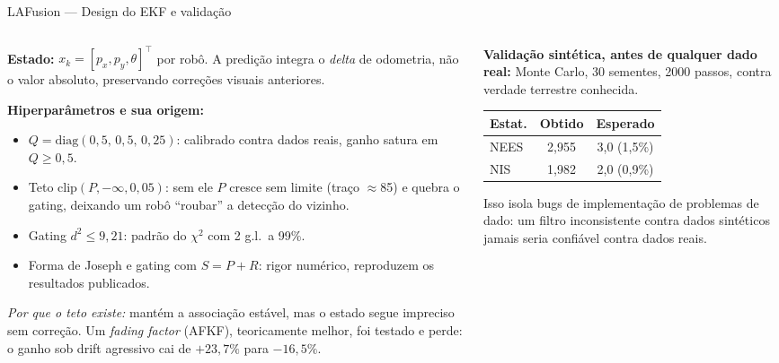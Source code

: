 \documentclass[aspectratio=169]{beamer}
\begin{document}
\begin{frame}{LAFusion — Design do EKF e validação}
\begin{columns}[T]
\begin{column}{0.54\textwidth}
\scriptsize
\textbf{Estado:} $x_k=[p_x,p_y,\theta]^\top$ por robô. A predição integra o \emph{delta} de odometria, não o valor absoluto, preservando correções visuais anteriores.

\vspace{0.1cm}
\textbf{Hiperparâmetros e sua origem:}
\begin{itemize}\scriptsize\itemsep1pt
\item $Q=\text{diag}(0{,}5,\,0{,}5,\,0{,}25)$: calibrado contra dados reais, ganho satura em $Q\geq0{,}5$.
\item Teto $\text{clip}(P,-\infty,0{,}05)$: sem ele $P$ cresce sem limite (traço $\approx$85) e quebra o gating, deixando um robô ``roubar'' a detecção do vizinho.
\item Gating $d^2\leq9{,}21$: padrão do $\chi^2$ com 2 g.l.\ a 99\%.
\item Forma de Joseph e gating com $S=P+R$: rigor numérico, reproduzem os resultados publicados.
\end{itemize}

\vspace{0.1cm}
\emph{Por que o teto existe:} mantém a associação estável, mas o estado segue impreciso sem correção. Um \emph{fading factor} (AFKF), teoricamente melhor, foi testado e perde: o ganho sob drift agressivo cai de $+23{,}7\%$ para $-16{,}5\%$.
\end{column}
\begin{column}{0.46\textwidth}
\scriptsize
\textbf{Validação sintética, antes de qualquer dado real:} Monte Carlo, 30 sementes, 2000 passos, contra verdade terrestre conhecida.

\vspace{0.1cm}
\begin{center}
\begin{tabular}{lcc}
\toprule
\textbf{Estat.} & \textbf{Obtido} & \textbf{Esperado} \\
\midrule
NEES & 2,955 & 3,0 (1,5\%) \\
NIS & 1,982 & 2,0 (0,9\%) \\
\bottomrule
\end{tabular}
\end{center}

\vspace{0.1cm}
Isso isola bugs de implementação de problemas de dado: um filtro inconsistente contra dados sintéticos jamais seria confiável contra dados reais.


\end{column}
\end{columns}
\end{frame}
\end{document}
